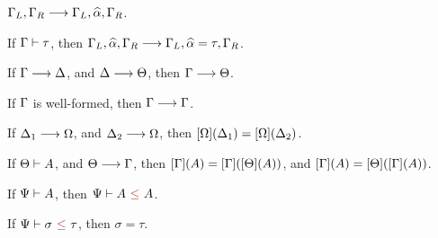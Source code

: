 \begin{lemma}
  \label{lemma:dunfield:UnsolvedVariableAdditionForExtension}
  $\Gamma_L, \Gamma_R \longrightarrow \Gamma_L, \widehat{\alpha}, \Gamma_R $.
\end{lemma}

\begin{lemma}
  \label{lemma:dunfield:SolutionAdmissibilityForExtension}
  If $\Gamma \vdash \tau$,
  then $\Gamma_L, \widehat{\alpha}, \Gamma_R \longrightarrow \Gamma_L, \widehat{\alpha} = \tau, \Gamma_R $.
\end{lemma}

\begin{lemma}[Transitivity]
  \label{lemma:dunfield:Transitivity}
  If $\Gamma \longrightarrow \Delta$,
  and $\Delta \longrightarrow \Theta$,
  then $\Gamma \longrightarrow \Theta$.
\end{lemma}

\begin{lemma}[Reflexivity]
  \label{lemma:dunfield:Reflexivity}
  If $\Gamma$ is well-formed,
  then $\Gamma \longrightarrow \Gamma$.
\end{lemma}

\begin{lemma}
  \label{lemma:dunfield:ConfluenceOfCompleteness}
  If $\Delta_1 \longrightarrow \Omega$,
  and $\Delta_2 \longrightarrow \Omega$,
  then $[\Omega](\Delta_1) = [\Omega](\Delta_2) $.
\end{lemma}

\begin{lemma}
  \label{lemma:dunfield:SubstitutionExtensionInvariance}
  If $\Theta \vdash A $,
  and $\Theta \longrightarrow \Gamma $,
  then $[\Gamma](A) = [\Gamma]([\Theta](A)) $,
  and $[\Gamma](A) = [\Theta]([\Gamma](A)) $.
\end{lemma}

\begin{lemma}
  \label{lemma:dunfield:ReflexivityOfDeclarativeSubtyping}
  If $\Psi \vdash A$,
  then $\dctx \bysub A \dsub A $.
\end{lemma}

\begin{lemma}
  \label{lemma:dunfield:MonotypeEquality}
  If $\dctx \bysub \sigma \dsub \tau$,
  then $\sigma = \tau$.
\end{lemma}

